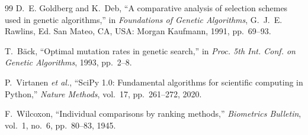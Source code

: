 \documentclass[journal,onecolumn,12pt]{IEEEtran}
\begin{document}
\begin{thebibliography}{99}
D.~E. Goldberg and K.~Deb,
``A comparative analysis of selection schemes used in genetic algorithms,''
in \emph{Foundations of Genetic Algorithms}, G.~J.~E. Rawlins, Ed. San Mateo, CA, USA: Morgan Kaufmann, 1991, pp.~69--93.

T.~B\"ack,
``Optimal mutation rates in genetic search,''
in \emph{Proc. 5th Int. Conf. on Genetic Algorithms}, 1993, pp.~2--8.

P.~Virtanen \emph{et al.},
``SciPy 1.0: Fundamental algorithms for scientific computing in Python,''
\emph{Nature Methods}, vol.~17, pp.~261--272, 2020.

F.~Wilcoxon,
``Individual comparisons by ranking methods,''
\emph{Biometrics Bulletin}, vol.~1, no.~6, pp.~80--83, 1945.

\end{thebibliography}
\end{document}
